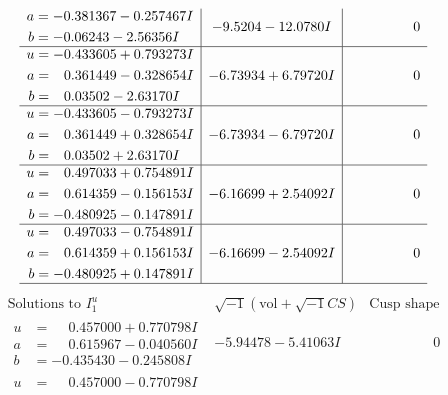 \documentclass[1p]{elsarticle_modified}
\theoremstyle{definition}
\newcommand{\I}{\sqrt{-1}}
\begin{document}
$$\begin{array}{c|c|c}
\begin{aligned}
a &= -0.381367 - 0.257467 I \\
b &= -0.06243 - 2.56356 I\end{aligned}
 & -9.5204 - 12.0780 I & \phantom{-0.000000 } 0 \\ \hline\begin{aligned}
u &= -0.433605 + 0.793273 I \\
a &= \phantom{-}0.361449 - 0.328654 I \\
b &= \phantom{-}0.03502 - 2.63170 I\end{aligned}
 & -6.73934 + 6.79720 I & \phantom{-0.000000 } 0 \\ \hline\begin{aligned}
u &= -0.433605 - 0.793273 I \\
a &= \phantom{-}0.361449 + 0.328654 I \\
b &= \phantom{-}0.03502 + 2.63170 I\end{aligned}
 & -6.73934 - 6.79720 I & \phantom{-0.000000 } 0 \\ \hline\begin{aligned}
u &= \phantom{-}0.497033 + 0.754891 I \\
a &= \phantom{-}0.614359 - 0.156153 I \\
b &= -0.480925 - 0.147891 I\end{aligned}
 & -6.16699 + 2.54092 I & \phantom{-0.000000 } 0 \\ \hline\begin{aligned}
u &= \phantom{-}0.497033 - 0.754891 I \\
a &= \phantom{-}0.614359 + 0.156153 I \\
b &= -0.480925 + 0.147891 I\end{aligned}
 & -6.16699 - 2.54092 I & \phantom{-0.000000 } 0\\
 \hline 
 \end{array}$$\newpage$$\begin{array}{c|c|c}  
\text{Solutions to }I^u_{1}& \I (\text{vol} + \sqrt{-1}CS) & \text{Cusp shape}\\
 \hline 
\begin{aligned}
u &= \phantom{-}0.457000 + 0.770798 I \\
a &= \phantom{-}0.615967 - 0.040560 I \\
b &= -0.435430 - 0.245808 I\end{aligned}
 & -5.94478 - 5.41063 I & \phantom{-0.000000 } 0 \\ \hline\begin{aligned}
u &= \phantom{-}0.457000 - 0.770798 I \\

\end{aligned}
\end{array}$$
\end{document}

